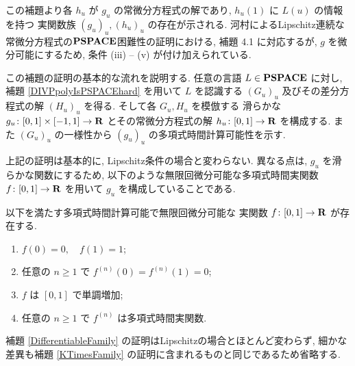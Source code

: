  この補題より各 $h_u$ が $g_u$ の常微分方程式の解であり, 
 $h_u(1)$ に $L(u)$ の情報を持つ
 実関数族 $(g_u)_u, (h_u)_u$ の存在が示される.
 河村によるLipschitz連続な常微分方程式の$\mathbf{PSPACE}$困難性の証明における,
 補題 4.1 に対応するが,
 $g$ を微分可能にするため, 条件 (iii) -- (v) が付け加えられている.
 

 この補題の証明の基本的な流れを説明する.
 任意の言語 $L \in \mathbf{PSPACE}$ に対し, 
 補題 \ref{DIVPpolyIsPSPACEhard} を用いて $L$ を認識する $(G_u)_u$ 
 及びその差分方程式の解 $(H_u)_u$ を得る.
 そして各 $G_u, H_u$ を模倣する
 滑らかな $g_u \colon [0,1] \times [-1, 1] \to \mathbf R$ 
 とその常微分方程式の解 $h_u \colon [0,1] \to \mathbf R$ を構成する.
 また $(G_u)_u$ の一様性から $(g_u)_u$ の多項式時間計算可能性を示す.


 上記の証明は基本的に, Lipschitz条件の場合と変わらない.
 異なる点は, $g_u$ を滑らかな関数にするため, 
 以下のような無限回微分可能な多項式時間実関数 $f \colon [0,1] \to \mathbf R$ を用いて
 $g_u$ を構成していることである.

 \begin{lemma}
  \label{SmoothFunction}
  以下を満たす多項式時間計算可能で無限回微分可能な
  実関数 $f \colon [0,1] \to \mathbf R$ が存在する.

  \begin{enumerate}
   \item $f(0) = 0, \quad f(1) = 1$;
   \item 任意の $n \ge 1$ で $f^{(n)}(0) = f^{(n)}(1) = 0$;
   \item $f$ は $[0,1]$ で単調増加;
   \item 任意の $n \ge 1$ で $f^{(n)}$ は多項式時間実関数.
  \end{enumerate}
 \end{lemma} 

 補題 \ref{DifferentiableFamily} の証明はLipschitzの場合とほとんど変わらず,
 細かな差異も補題 \ref{KTimesFamily} の証明に含まれるものと同じであるため省略する.

